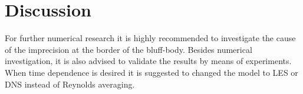 \documentclass{CFD2017}
\begin{document}
\section{Discussion}
For further numerical research it is highly recommended to investigate the cause of the imprecision at the border of the bluff-body. 
Besides numerical investigation, it is also advised to validate the results by means of experiments.
When time dependence is desired it is suggested to changed the model to LES or DNS instead of Reynolds averaging. 




\end{document}
